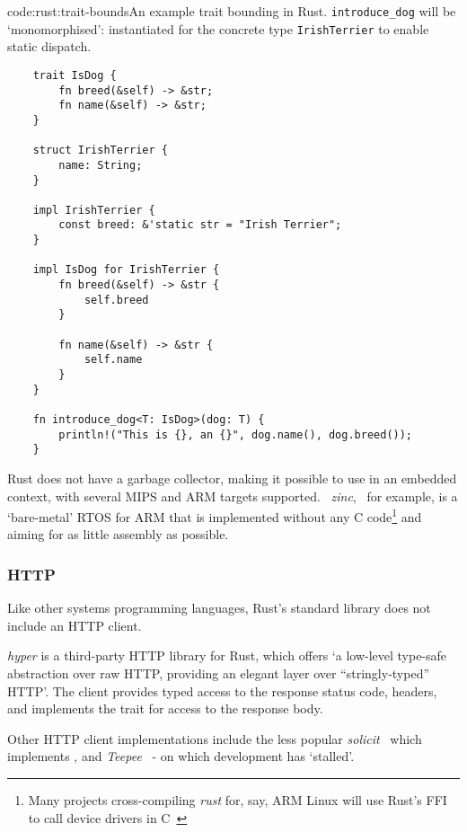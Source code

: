 \begin{codelisting}{code:rust:trait-bounds}{An example trait bounding in Rust. \texttt{introduce_dog} will be `monomorphised': instantiated for the concrete type \texttt{IrishTerrier} to enable static dispatch.}
\begin{spacing}{\codespacing}
\begin{verbatim}
    trait IsDog {
        fn breed(&self) -> &str;
        fn name(&self) -> &str;
    }
    
    struct IrishTerrier {
        name: String;
    }
    
    impl IrishTerrier {
        const breed: &'static str = "Irish Terrier";
    }
    
    impl IsDog for IrishTerrier {
        fn breed(&self) -> &str {
        	self.breed
        }
        
        fn name(&self) -> &str {
        	self.name
        }
    }
    
    fn introduce_dog<T: IsDog>(dog: T) {
        println!("This is {}, an {}", dog.name(), dog.breed());
    }
\end{verbatim}
\end{spacing}
\end{codelisting}

Rust does not have a garbage collector, making it possible to use in an embedded context, with several MIPS and ARM targets supported.~\cite{rust_platforms} \emph{zinc},~\cite{rust_rtos_zinc} for example, is a `bare-metal' RTOS for ARM that is implemented without any C code\footnote{Many projects cross-compiling \emph{rust} for, say, ARM Linux will use Rust's FFI to call device drivers in C~\cite{rust_baremetal}} and aiming for as little assembly as possible.

\subsubsection{HTTP} \label{bg:rust:http}
Like other systems programming languages, Rust's standard library does not include an HTTP client.

\emph{hyper} is a third-party HTTP library for Rust, which offers `a low-level type-safe abstraction over raw HTTP, providing an elegant layer over ``stringly-typed'' HTTP'. The client provides typed access to the response status code, headers, and implements the  trait for access to the response body. \cite{rust_http_hyper}

Other HTTP client implementations include the less popular \emph{solicit}~\cite{rust_http_solicit} which implements , and \emph{Teepee}~\cite{rust_http_teepee} - on which development has `stalled'.

